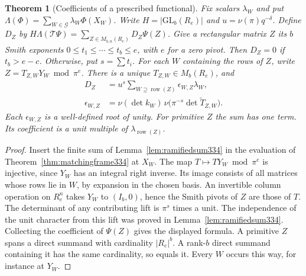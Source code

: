 \documentclass[a4paper,11pt]{article}
\newtheorem{theorem}[proposition]{Theorem}
\theoremstyle{definition}
\theoremstyle{remark}
\numberwithin{equation}{section}
\begin{document}
\begin{theorem}[Coefficients of a prescribed functional]\label{thm:signedrow335}
Fix scalars \(\lambda_W\) and put
\(\Lambda(\Phi)=\sum_{W\in\mathcal G}\lambda_W\Phi(X_W)\).
Write \(H=|\mathrm{GL}_b(R_e)|\) and
\(u=\nu(\pi)q^{-\delta}\). Define \(D_Z\) by
\(H\Lambda(\mathcal T\Psi)=\sum_{Z\in M_{b,n}(R_e)}D_Z\Psi(Z)\).
Give a rectangular matrix \(Z\) its \(b\) Smith exponents
\(0\le t_1\le\cdots\le t_b\le e\), with \(e\) for a zero pivot.
Then \(D_Z=0\) if \(t_b>e-c\). Otherwise, put \(s=\sum t_i\). For
each \(W\) containing the rows of \(Z\), write \(Z=T_{Z,W}Y_W\bmod\pi^e\).
There is a unique \(T_{Z,W}\in M_b(R_e)\), and
\[
 \begin{split}
 D_Z&=u^s\sum_{W\supseteq\operatorname{row}(Z)}
                     \epsilon_{W,Z}\lambda_W,\\
 \epsilon_{W,Z}&=\nu(\det k_W)\,
          \nu\bigl(\pi^{-s}\det\widetilde T_{Z,W}\bigr).
 \end{split}
\]
Each \(\epsilon_{W,Z}\) is a well-defined root of unity. For primitive
\(Z\) the sum has one term. Its coefficient is a unit multiple of
\(\lambda_{\operatorname{row}(Z)}\).
\end{theorem}
\begin{proof}
Insert the finite sum of Lemma~\ref{lem:ramifiedsum334} in the evaluation
of Theorem~\ref{thm:matchingframe334} at \(X_W\). The map
\(T\mapsto TY_W\bmod\pi^e\) is injective, since \(Y_W\) has an integral
right inverse. Its image consists of all matrices whose rows lie in \(W\),
by expansion in the chosen basis. An invertible column operation on
\(R_e^n\) takes \(Y_W\) to \((I_b,0)\), hence the Smith pivots of \(Z\)
are those of \(T\). The determinant of any contributing lift is
\(\pi^s\) times a unit. The independence of the unit character from
this lift was proved in Lemma~\ref{lem:ramifiedsum334}. Collecting the
coefficient of \(\Psi(Z)\) gives the displayed formula. A primitive
\(Z\) spans a direct summand with cardinality \(|R_e|^b\).
A rank-\(b\) direct summand containing it has the same cardinality,
so equals it. Every \(W\) occurs this way, for instance at \(Y_W\).
\end{proof}
\end{document}
